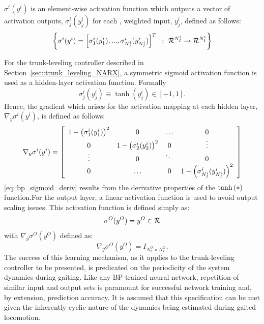 		$\sigma^{i}(y^{i})$ is an element-wise activation function which outputs a vector of activation outputs, $\sigma_{j}^{i}(y_{j}^{i}) $ for each \Jth, weighted input, $y_{j}^{i}$, defined as follows:
			\begin{equation}
				\left\{ \sigma^{i}(y^{i}) = \left[ \sigma_{1}^{i}(y_{1}^{i}),...,\sigma_{N_{I}^{i}}^{i}(y_{N_{I}^{i}}^{i}) \right]^{T} \text{ } : \text{ } {\cal R}^{N_{I}^{i}} \rightarrow {\cal R}^{N_{I}^{i}}\right\}
			\end{equation}


		For the trunk-leveling controller described in Section~\ref{sec::trunk_leveling_NARX}, a symmetric sigmoid activation function is used as a hidden-layer activation function. Formally
			\begin{equation}
				\sigma_{j}^{i}(y_{j}^{i}) \equiv \tanh(y_{j}^{i}) \in [-1,1]. 
				\label{eq::activation_function}
			\end{equation}
		Hence, the gradient which arises for the activation mapping at each hidden layer, $\nabla_{y} \sigma^{i}(y^{i})$, is defined as follows: 
			\newcommand{\acti}[1]{1 - \wrap{\sigma^{i}_{#1}(y^{i}_{#1})}^{2}}
			\begin{equation}
				\nabla_{y} \sigma^{i}(y^{i})  =
				\left[
				\begin{array}{cccc}
					\acti{1} 	&	0		&	\ldots 		&	0 			\\	
					0			&	\acti{2}&	0			& 	\vdots 		\\
					\vdots 		&	0		& 	\ddots 		& 	0			\\
						0			&	\ldots	&	0			& 	\acti{N_{I}^{i}}
				\end{array}
				\right]
				\label{eq::bp_sigmoid_deriv}
			\end{equation} 
		\ref{eq::bp_sigmoid_deriv} results from the derivative properties of the $\tanh\left(*\right)$ function.For the output layer, a linear activation function is used to avoid output scaling issues. This activation function is defined simply as:
			\begin{equation}
				\sigma^{O}(y^{O}) = y^{O} \in {\cal R}
				\label{eq::output_activation_function}
			\end{equation}
		with $\nabla_{y}\sigma^{O}(y^{O})$ defined as:
			\begin{equation}
				\nabla_{y}\sigma^{O}(y^{O}) = I_{N_{I}^{O}\times N_{I}^{O}} . 
				\label{eq::bp_linear_deriv}
			\end{equation}		
		The success of this learning mechanism, as it applies to the trunk-leveling controller to be presented, is predicated on the periodicity of the system dynamics during gaiting. Like any BP-trained neural network, repetition of similar input and output sets is paramount for successful network training and, by extension, prediction accuracy. It is assumed that this specification can be met given the inherently cyclic nature of the dynamics being estimated during gaited locomotion. 








